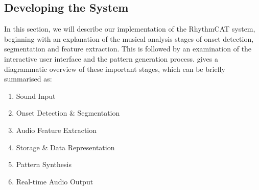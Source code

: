 %
%
%

\subsection{Developing the System}

In this section, we will describe our implementation of the RhythmCAT system, beginning with an explanation of the musical analysis stages of onset detection, segmentation and feature extraction. This is followed by an examination of the interactive user interface and the pattern generation process.  gives a diagrammatic overview of these important stages, which can be briefly summarised as:

\begin{enumerate}
  \item Sound Input
  \item Onset Detection \& Segmentation
  \item Audio Feature Extraction
  \item Storage \& Data Representation
  \item Pattern Synthesis
  \item Real-time Audio Output
\end{enumerate}

